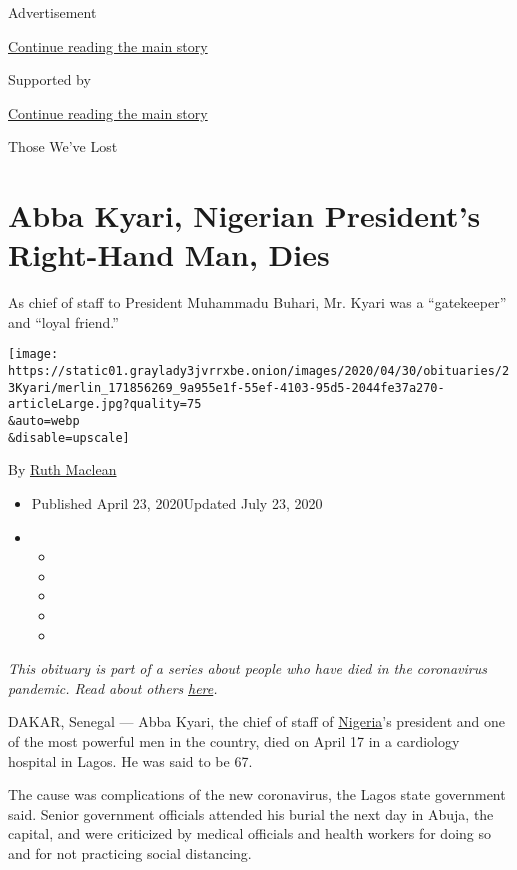 Advertisement

\protect\hyperlink{after-top}{Continue reading the main story}

Supported by

\protect\hyperlink{after-sponsor}{Continue reading the main story}

Those We've Lost

\hypertarget{abba-kyari-nigerian-presidents-right-hand-man-dies}{%
\section{Abba Kyari, Nigerian President's Right-Hand Man,
Dies}\label{abba-kyari-nigerian-presidents-right-hand-man-dies}}

As chief of staff to President Muhammadu Buhari, Mr. Kyari was a
``gatekeeper'' and ``loyal friend.''

\texttt{[image: https://static01.graylady3jvrrxbe.onion/images/2020/04/30/obituaries/23Kyari/merlin\_171856269\_9a955e1f-55ef-4103-95d5-2044fe37a270-articleLarge.jpg?quality=75\\\&auto=webp\\\&disable=upscale]}

By \href{https://www.nytimes3xbfgragh.onion/by/ruth-maclean}{Ruth
Maclean}

\begin{itemize}
\item
  Published April 23, 2020Updated July 23, 2020
\item
  \begin{itemize}
  \item
  \item
  \item
  \item
  \item
  \end{itemize}
\end{itemize}

\emph{This obituary is part of a series about people who have died in
the coronavirus pandemic. Read about others}
\href{https://www.nytimes3xbfgragh.onion/series/people-who-have-died-of-the-coronavirus}{\emph{here}}\emph{.}

DAKAR, Senegal --- Abba Kyari, the chief of staff of
\href{https://www.nytimes3xbfgragh.onion/2020/07/23/world/africa/aid-workers-executed-nigeria.html}{Nigeria}'s
president and one of the most powerful men in the country, died on April
17 in a cardiology hospital in Lagos. He was said to be 67.

The cause was complications of the new coronavirus, the Lagos state
government said. Senior government officials attended his burial the
next day in Abuja, the capital, and were criticized by medical officials
and health workers for doing so and for not practicing social
distancing.

